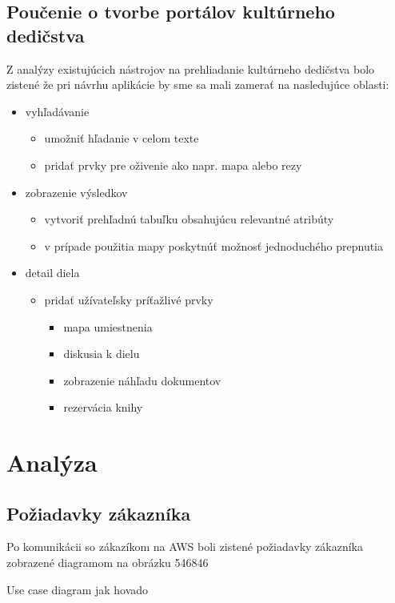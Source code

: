 \documentclass[
  digital, %
  table,   %
  lof,     %
  lot,     %
]{fithesis3}
\begin{document}
\section{Poučenie o tvorbe portálov kultúrneho dedičstva}
Z analýzy existujúcich nástrojov na prehliadanie kultúrneho dedičstva bolo zistené že pri návrhu aplikácie by sme sa mali zamerať na nasledujúce oblasti:
\begin{itemize}
	\item vyhľadávanie
	\begin{itemize}
		\item umožniť hľadanie v celom texte 
		\item pridať prvky pre oživenie ako napr. mapa alebo rezy
	\end{itemize}
	\item zobrazenie výsledkov
	\begin{itemize}
		\item vytvoriť prehľadnú tabuľku obsahujúcu relevantné atribúty
		\item v prípade použitia mapy poskytnúť možnosť jednoduchého prepnutia 
	\end{itemize}
	\item detail diela
	\begin{itemize}
		\item pridať užívateľsky príťažlivé prvky
		\begin{itemize}
			\item mapa umiestnenia				
			\item diskusia k dielu
			\item zobrazenie náhľadu dokumentov
			\item rezervácia knihy
		\end{itemize}
	\end{itemize}	
\end{itemize}

\chapter{Analýza}
\section{Požiadavky zákazníka}
Po komunikácii so zákazíkom na AWS boli zistené požiadavky zákazníka zobrazené diagramom na obrázku 546846

Use case diagram jak hovado
\end{document}
